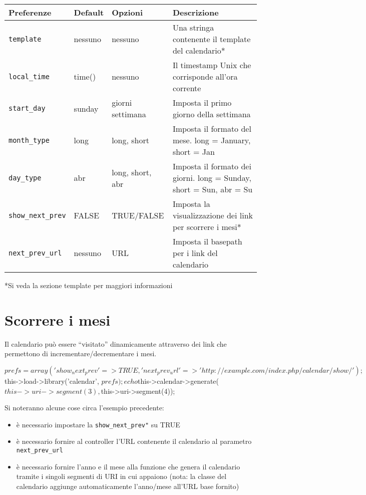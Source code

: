 \footnotesize
\begin{center}
\begin{tabularx}{\columnwidth}{lXXX}
\toprule
Preferenze & Default & Opzioni & Descrizione \\ 
\midrule
\verb|template| & nessuno  & nessuno & Una stringa contenente il template del calendario* \\
\verb|local_time| & time() & nessuno  & Il timestamp Unix che corrisponde all'ora corrente \\
\verb|start_day| & sunday & giorni settimana & Imposta il primo giorno della settimana \\
\verb|month_type| & long & long, short & Imposta il formato del mese. long = January, short = Jan \\
\verb|day_type| & abr & long, short, abr & Imposta il formato dei giorni. long = Sunday, short = Sun, abr = Su \\
\verb|show_next_prev| & FALSE & TRUE/FALSE & Imposta la visualizzazione dei link per scorrere i mesi* \\
\verb|next_prev_url| & nessuno & URL & Imposta il basepath per i link del calendario \\
\bottomrule
\end{tabularx}
\end{center}
\normalsize

*Si veda la sezione template per maggiori informazioni

\section*{Scorrere i mesi}
Il calendario può essere ``visitato'' dinamicamente attraverso dei link che permettono di incrementare/decrementare i mesi.

\begin{code}
$prefs = array (
               'show_next_prev'  => TRUE,
               'next_prev_url'   => 'http://example.com/index.php/calendar/show/'
             );

$this->load->library('calendar', $prefs);

echo $this->calendar->generate($this->uri->segment(3), $this->uri->segment(4));
\end{code}

Si noteranno alcune cose circa l'esempio precedente:

\begin{itemize}
\item è necessario impostare la \verb|show_next_prev"| su TRUE
\item è necessario fornire al controller l'\ac{URL} contenente il calendario al parametro \verb|next_prev_url|
\item è necessario fornire l'anno e il mese alla funzione che genera il calendario tramite i singoli segmenti di \ac{URI} in cui appaiono (nota: la classe del calendario aggiunge automaticamente l'anno/mese all'\ac{URL} base fornito)
\end{itemize}

